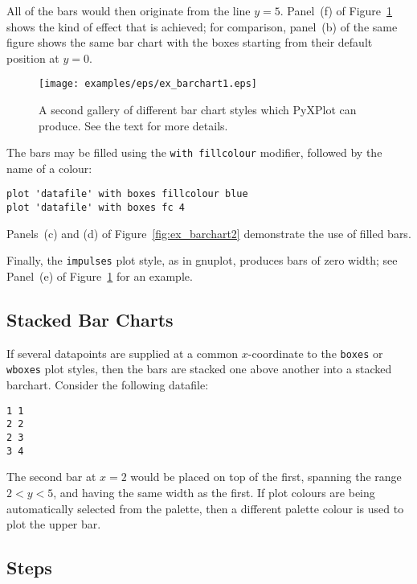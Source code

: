 \noindent All of the bars would then originate from the line $y=5$. Panel~(f)
of Figure~\ref{fig:ex_barchart1} shows the kind of effect that is achieved; for
comparison, panel~(b) of the same figure shows the same bar chart with the
boxes starting from their default position at $y=0$.

\begin{figure}
\begin{center}
\texttt{[image: examples/eps/ex\_barchart1.eps]}
\end{center}
\caption{A second gallery of different bar chart styles which PyXPlot can produce. See the text for more details.}
\label{fig:ex_barchart1}
\end{figure}

The bars may be filled using the \texttt{with fillcolour} modifier, followed by the name of a
colour:

\begin{verbatim} 
plot 'datafile' with boxes fillcolour blue
plot 'datafile' with boxes fc 4
\end{verbatim}

\noindent Panels~(c) and (d) of Figure~\ref{fig:ex_barchart2} demonstrate the
use of filled bars.

Finally, the \texttt{impulses} plot style, as in gnuplot, produces bars of zero
width; see Panel~(e) of Figure~\ref{fig:ex_barchart1} for an example.

\subsection{Stacked Bar Charts}

If several datapoints are supplied at a common $x$-coordinate to the
\texttt{boxes} or \texttt{wboxes} plot styles, then the bars are stacked one
above another into a stacked barchart. Consider the following datafile:

\begin{verbatim} 
1 1
2 2
2 3
3 4
\end{verbatim}

The second bar at $x=2$ would be placed on top of the first, spanning the range
$2<y<5$, and having the same width as the first. If plot colours are being
automatically selected from the palette, then a different palette colour is
used to plot the upper bar.

\subsection{Steps}

